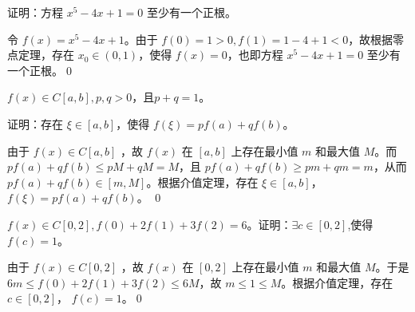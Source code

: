         \begin{example}
            证明：方程 $x^5-4x+1=0$ 至少有一个正根。
        \end{example}

        \begin{solution}
            令 $f(x)=x^5-4x+1$。由于 $f(0)=1>0,f(1)=1-4+1<0$，故根据零点定理，存在 $x_0 \in (0,1)$，使得 $f(x)=0$，也即方程 $x^5-4x+1=0$ 至少有一个正根。\qed
        \end{solution}

        \begin{example}
            $f(x)\in C[a,b],p,q>0$，且$p+q=1$。

            证明：存在 $\xi \in [a,b]$，使得 $f(\xi)=pf(a)+qf(b)$。
        \end{example}

        \begin{solution}
            由于 $f(x)\in C[a,b]$ ，故 $f(x)$ 在  $[a,b]$ 上存在最小值 $m$ 和最大值 $M$。而 $pf(a)+qf(b)\leq pM+qM=M$，且 $pf(a)+qf(b)\geq  pm+qm=m$，从而 $pf(a)+qf(b) \in [m,M]$。根据介值定理，存在 $\xi \in [a,b]$， $f(\xi)=pf(a)+qf(b)$。 \qed
        \end{solution}

        \begin{example}
            $f(x) \in C[0,2],f(0)+2f(1)+3f(2)=6$。证明：$\exists c \in [0,2]$,使得 $f(c)=1$。
        \end{example}

        \begin{solution}
            由于 $f(x)\in C[0,2]$ ，故 $f(x)$ 在  $[0,2]$ 上存在最小值 $m$ 和最大值 $M$。于是 $6m\leq f(0)+2f(1)+3f(2) \leq 6M$，故 $m \leq 1 \leq M$。根据介值定理，存在 $c\in[0,2]$， $f(c)=1$。\qed
        \end{solution}

